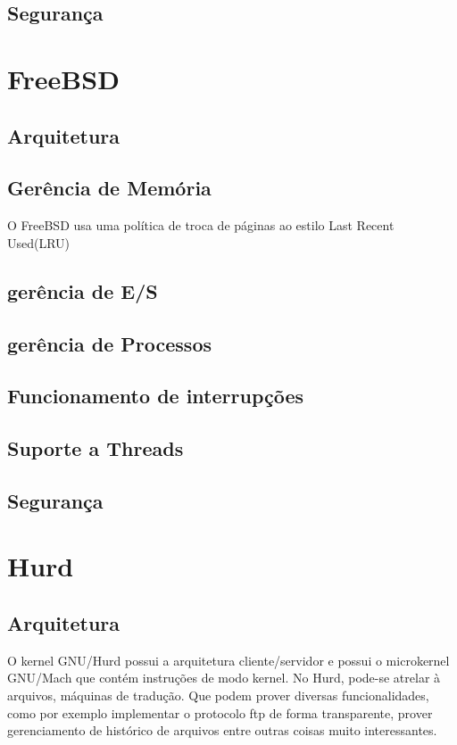 \documentclass[conference]{IEEEtran}
\begin{document}
\subsection{Segurança}\label{sec:LinuxSec}

\section{FreeBSD}\label{sec:BSD}

\subsection{Arquitetura}\label{sec:BSDArq}

\subsection{Gerência de Memória}\label{sec:BSDMem}
O FreeBSD usa uma política de troca de páginas ao estilo Last Recent Used(LRU)\cite{FreeBsdArc}

\subsection{gerência de E/S}\label{sec:BSDES}

\subsection{gerência de Processos}\label{sec:BSDPROC}

\subsection{Funcionamento de interrupções}\label{sec:BSDInt}

\subsection{Suporte a Threads}\label{sec:BSDThreads}

\subsection{Segurança}\label{sec:BSDSec}

\section{Hurd}\label{sec:Hurd}

\subsection{Arquitetura}\label{sec:HurdArq}
O kernel GNU/Hurd possui a arquitetura cliente/servidor e possui o microkernel GNU/Mach que contém instruções de modo kernel. No Hurd, pode-se atrelar à arquivos, máquinas de tradução. Que podem prover diversas funcionalidades, como por exemplo implementar o protocolo ftp de forma transparente, prover gerenciamento de histórico de arquivos entre outras coisas muito interessantes.\cite{HurdPaper}
\end{document}
